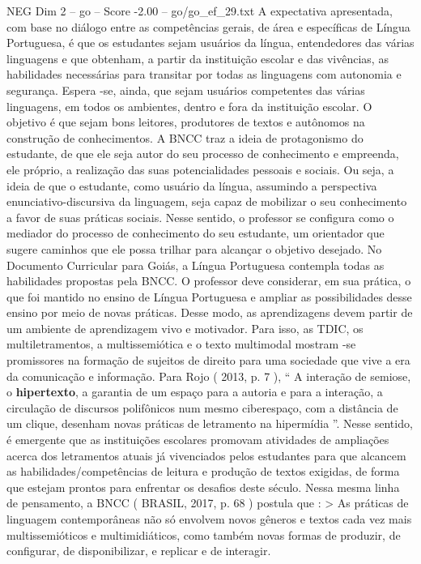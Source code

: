 \begin{textsample}{NEG Dim 2 – go – Score -2.00 – go/go\_ef\_29.txt}  \label{ex:f2_neg_116}
A expectativa apresentada, com base no diálogo entre as competências gerais, de área e específicas de Língua Portuguesa, é que os estudantes sejam usuários da língua, entendedores das várias linguagens e que obtenham, a partir da instituição escolar e das vivências, as habilidades necessárias para transitar por todas as linguagens com autonomia e segurança.
Espera -se, ainda, que sejam usuários competentes das várias linguagens, em todos os ambientes, dentro e fora da instituição escolar.
O objetivo é que sejam bons leitores, produtores de textos e autônomos na construção de conhecimentos.
A BNCC traz a ideia de protagonismo do estudante, de que ele seja autor do seu processo de conhecimento e empreenda, ele próprio, a realização das suas potencialidades pessoais e sociais.
Ou seja, a ideia de que o estudante, como usuário da língua, assumindo a perspectiva enunciativo-discursiva da linguagem, seja capaz de mobilizar o seu conhecimento a favor de suas práticas sociais.
Nesse sentido, o professor se configura como o mediador do processo de conhecimento do seu estudante, um orientador que sugere caminhos que ele possa trilhar para alcançar o objetivo desejado.
No Documento Curricular para Goiás, a Língua Portuguesa contempla todas as habilidades propostas pela BNCC.
O professor deve considerar, em sua prática, o que foi mantido no ensino de Língua Portuguesa e ampliar as possibilidades desse ensino por meio de novas práticas.
Desse modo, as aprendizagens devem partir de um ambiente de aprendizagem vivo e motivador.
Para isso, as TDIC, os multiletramentos, a multissemiótica e o texto multimodal mostram -se promissores na formação de sujeitos de direito para uma sociedade que vive a era da comunicação e informação.
Para Rojo ( 2013, p. 7 ), “ A interação de semiose, o \textbf{hipertexto}, a garantia de um espaço para a autoria e para a interação, a circulação de discursos polifônicos num mesmo ciberespaço, com a distância de um clique, desenham novas práticas de letramento na hipermídia ”.
Nesse sentido, é emergente que as instituições escolares promovam atividades de ampliações acerca dos letramentos atuais já vivenciados pelos estudantes para que alcancem as habilidades/competências de leitura e produção de textos exigidas, de forma que estejam prontos para enfrentar os desafios deste século.
Nessa mesma linha de pensamento, a BNCC ( BRASIL, 2017, p. 68 ) postula que : > As práticas de linguagem contemporâneas não só envolvem novos gêneros e textos cada vez mais multissemióticos e multimidiáticos, como também novas formas de produzir, de configurar, de disponibilizar, e replicar e de interagir.

\end{textsample}
